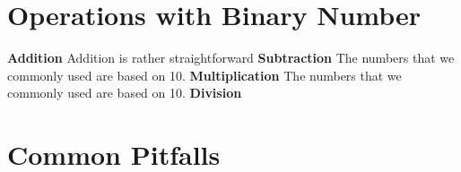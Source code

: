 \section{Operations with Binary Number}
\noindent\large\textbf{Addition}\newline
\normalsize Addition is rather straightforward\newline
\noindent\large\textbf{Subtraction}\newline
\normalsize The numbers that we commonly used are based on 10.\newline
\noindent\large\textbf{Multiplication}\newline
\normalsize The numbers that we commonly used are based on 10.\newline
\noindent\large\textbf{Division}\newline
\normalsize \newline

\section{Common Pitfalls}